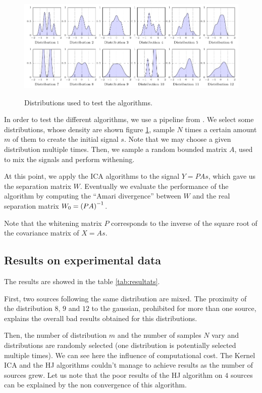 \documentclass[a4paper]{article}
\begin{document}
\begin{figure}
\centering
\includegraphics[scale=0.9]{figure_tikz/graph_distrib.pdf}\\
\caption{Distributions used to test the algorithms.\label{fig:distrib}}
\end{figure}

In order to test the different algorithms, we use a pipeline from \cite{bach2003kernel}.
We select some distributions, whose density are shown figure \ref{fig:distrib},
sample $N$ times a certain amount $m$ of them to create the initial signal $s$. Note that we may choose a given distribution multiple times.
Then, we sample a random bounded matrix $A$, used to mix the signals and perform withening.

At this point, we apply the ICA algorithms to the signal $Y = PAs$, which gave us the separation matrix $W$.
Eventually we evaluate the performance of the algorithm by computing the ``Amari divergence'' between $W$ and the real separation matrix $W_0 = \zp{PA}^{-1}$.

Note that the whitening matrix $P$ corresponds to the inverse of the square root of the covariance matrix of $X=As$.

\subsection{Results on experimental data}

The results are showed in the table \ref{tab:resultats}.

First, two sources following the same distribution are mixed.
The proximity of the distribution $8$, $9$ and $12$ to the gaussian, prohibited
for more than one source, explains the overall bad results obtained for this
distributions.

Then, the number of distribution $m$ and the number of samples $N$ vary and distributions are randomly selected (one distribution is
potentially selected multiple times). We can see here the influence of
computational cost. The Kernel ICA and the HJ algorithms couldn't manage to
achieve results as the number of sources grew. Let us note that the poor results of the HJ algorithm on $4$ sources can be explained by the non convergence of this algorithm.
\end{document}
